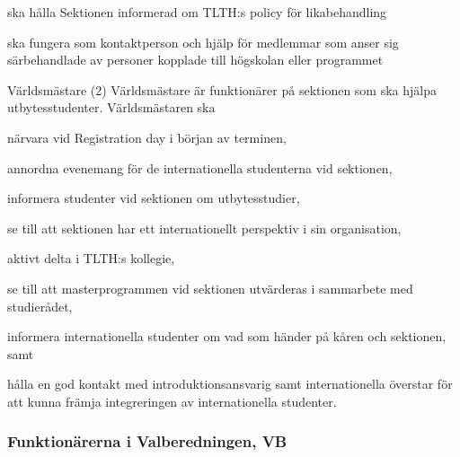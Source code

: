 \documentclass[10pt]{article}
\begin{document}
\begin{emptylist}
\begin{dashlist}
            \item ska hålla Sektionen informerad om TLTH:s policy för likabehandling
            \item ska fungera som kontaktperson och hjälp för medlemmar som anser sig särbehandlade av personer kopplade till högskolan eller programmet
        \end{dashlist}
    \item Världsmästare (2)
    	Världsmästare är funktionärer på sektionen som ska hjälpa utbytesstudenter. Världsmästaren ska
    	 \begin{dashlist}
    		\item närvara vid Registration day i början av terminen,
    		\item annordna evenemang för de internationella studenterna vid sektionen,
    		\item informera studenter vid sektionen om utbytesstudier,
    		\item se till att sektionen har ett internationellt perspektiv i sin organisation,
    		\item aktivt delta i TLTH:s kollegie,
    		\item se till att masterprogrammen vid sektionen utvärderas i sammarbete med studierådet,
    		\item informera internationella studenter om vad som händer på kåren och sektionen, samt
    		\item hålla en god kontakt med introduktionsansvarig samt internationella överstar för att kunna främja integreringen av internationella studenter.
    	\end{dashlist}
\end{emptylist}
\subsubsection{Funktionärerna i Valberedningen, VB}
\end{document}
